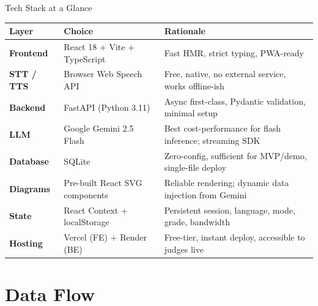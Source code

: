 \documentclass[aspectratio=169, 12pt]{beamer}
\begin{document}
\begin{frame}{Tech Stack at a Glance}
  \renewcommand{\arraystretch}{1.5}
  \begin{tabular}{>{\bfseries\small}p{}
                  >{\small}p{}
                  >{\small}p{}}
    \toprule
    \rowcolor{deepgreen!15}
    Layer & Choice & Rationale\\
    \midrule
    Frontend & React 18 + Vite + TypeScript & Fast HMR, strict typing, PWA-ready\\
    \rowcolor{lightgreen!20}
    STT / TTS & Browser Web Speech API & Free, native, no external service, works offline-ish\\
    Backend & FastAPI (Python 3.11) & Async first-class, Pydantic validation, minimal setup\\
    \rowcolor{lightgreen!20}
    LLM & Google Gemini 2.5 Flash & Best cost-performance for flash inference; streaming SDK\\
    Database & SQLite & Zero-config, sufficient for MVP/demo, single-file deploy\\
    \rowcolor{lightgreen!20}
    Diagrams & Pre-built React SVG components & Reliable rendering; dynamic data injection from Gemini\\
    State & React Context + localStorage & Persistent session, language, mode, grade, bandwidth\\
    \rowcolor{lightgreen!20}
    Hosting & Vercel (FE) + Render (BE) & Free-tier, instant deploy, accessible to judges live\\
    \bottomrule
  \end{tabular}
\end{frame}

\section{Data Flow}
\end{document}
